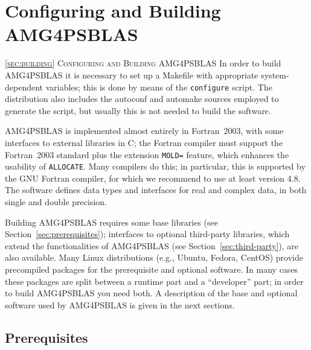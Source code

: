 \section{Configuring and Building AMG4PSBLAS\label{sec:building}}
         {\textsc{\ref{sec:building} Configuring and Building AMG4PSBLAS}}
In order to build AMG4PSBLAS it is necessary to set up a Makefile with appropriate
system-dependent variables; this is done by means of the \verb|configure|
script. The distribution also includes the autoconf and automake
sources employed to generate the script, but usually this is not needed
to build the software.

AMG4PSBLAS is implemented almost entirely in Fortran~2003, with some
interfaces to external libraries in C; the Fortran compiler
must support the Fortran~2003 standard plus the extension \verb|MOLD=|
feature, which enhances the usability of \verb|ALLOCATE|.
Many compilers do this; in particular, this is
supported by the GNU Fortran compiler, for which we
recommend to use at least version 4.8.
The software defines data types and interfaces for
real and complex data, in both single and double precision.

Building AMG4PSBLAS requires some base libraries (see Section~\ref{sec:prerequisites});
interfaces to optional third-party libraries, which extend the functionalities of AMG4PSBLAS
(see Section~\ref{sec:third-party}), are also available.  Many Linux distributions
(e.g., Ubuntu, Fedora, CentOS) provide precompiled packages for the prerequisite and
optional software. In many cases these packages are split between a runtime part and a
``developer'' part; in order to build AMG4PSBLAS you need both. A description of the base and
optional software used by AMG4PSBLAS is given in the next sections.

\subsection{Prerequisites\label{sec:prerequisites}}

